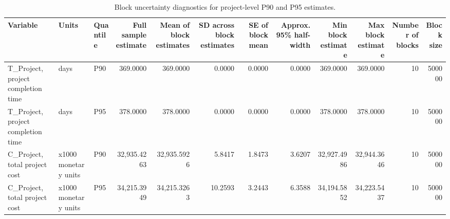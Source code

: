\begin{table}
\caption{Block uncertainty diagnostics for project-level P90 and P95 estimates.}
\label{tab:project-level-p90-p95-block-uncertainty}
\begin{tabular}{lllrrrrrrrrr}
\toprule
Variable & Units & Quantile & Full sample estimate & Mean of block estimates & SD across block estimates & SE of block mean & Approx. 95\% half-width & Min block estimate & Max block estimate & Number of blocks & Block size \\
\midrule
T\_Project, project completion time & days & P90 & 369.0000 & 369.0000 & 0.0000 & 0.0000 & 0.0000 & 369.0000 & 369.0000 & 10 & 500000 \\
T\_Project, project completion time & days & P95 & 378.0000 & 378.0000 & 0.0000 & 0.0000 & 0.0000 & 378.0000 & 378.0000 & 10 & 500000 \\
C\_Project, total project cost & x1000 monetary units & P90 & 32,935.4263 & 32,935.5926 & 5.8417 & 1.8473 & 3.6207 & 32,927.4986 & 32,944.3646 & 10 & 500000 \\
C\_Project, total project cost & x1000 monetary units & P95 & 34,215.3949 & 34,215.3263 & 10.2593 & 3.2443 & 6.3588 & 34,194.5852 & 34,223.5437 & 10 & 500000 \\
\bottomrule
\end{tabular}
\end{table}
